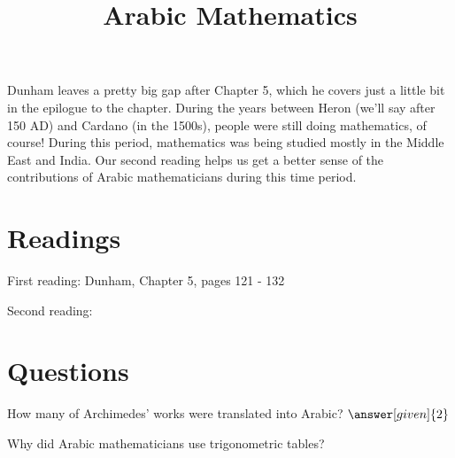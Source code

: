 \documentclass[nooutcomes]{ximera}
\title{Arabic Mathematics}
\begin{document}
\begin{abstract}
    
\end{abstract}
\maketitle

Dunham leaves a pretty big gap after Chapter 5, which he covers just a little bit in the epilogue to the chapter.  During the years between Heron (we'll say after 150 AD) and Cardano (in the 1500s), people were still doing mathematics, of course!  During this period, mathematics was being studied mostly in the Middle East and India.  Our second reading helps us get a better sense of the contributions of Arabic mathematicians during this time period.


\section{Readings}
First reading: Dunham, Chapter 5, pages 121 - 132 

Second reading: 

\section{Questions}

\begin{question}
How many of Archimedes' works were translated into Arabic? $\answer[given]{2}$
\end{question}

\begin{question}
Why did Arabic mathematicians use trigonometric tables?
\begin{multipleChoice}
\end{multipleChoice}
\end{question}


%
\end{document}
